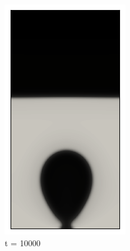 \begin{figure}[h!]
\begin{subfigure}{0.25\textwidth}
		\includegraphics[width=\linewidth]{figs/cap4/bubble_10}
		\caption{t = 10000}
		\label{fig:2}
	\end{subfigure}\hfil %
	\begin{subfigure}{0.25\textwidth}

\end{subfigure}
\end{figure}
